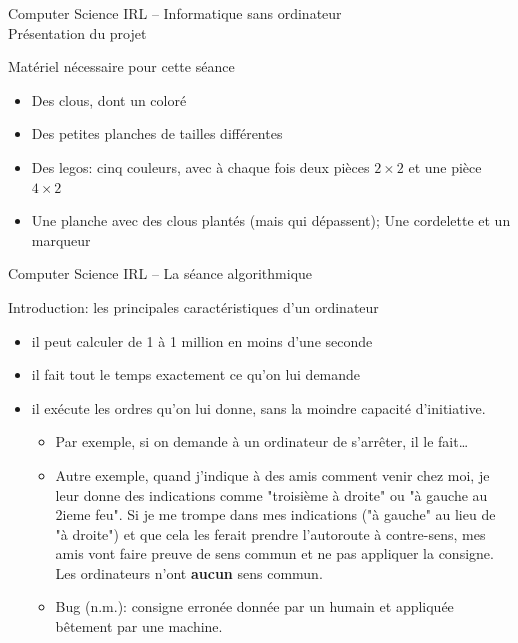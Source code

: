\documentclass[final,hyperref={pdfpagelabels=false}]{beamer}
\renewenvironment{Coupe}{   }{   }
\renewcommand*{\large}{\fontsize{\resultlargeX}{\resultlargeY}\selectfont}
\begin{document}
\begin{Coupe}
\begin{frame}{Computer Science IRL -- Informatique sans ordinateur\\[-5pt]
  {\large Présentation du projet}}
  \begin{block}{Matériel nécessaire pour cette séance}
    \begin{itemize}
    \item Des clous, dont un coloré
    \item Des petites planches de tailles différentes
    \item Des legos: cinq couleurs, avec à chaque fois deux pièces $2\times2$ et une
      pièce $4\times2$
    \item Une planche avec des clous plantés (mais qui dépassent); Une cordelette et un marqueur
    \end{itemize}
  \end{block}
\end{frame}
\begin{frame}{Computer Science IRL -- La séance algorithmique}
  \begin{block}{Introduction: les principales caractéristiques d'un ordinateur}
    \begin{itemize}\vspace{-.2\baselineskip}
    \item {} il peut calculer de 1 à 1
      million en moins d'une seconde
    \item {} il fait
    tout le temps exactement ce qu'on lui demande
    \item {} il exécute les
      ordres qu'on lui donne, sans la moindre capacité d'initiative.
      \begin{itemize}\vspace{-.8\baselineskip}
      \item Par exemple, si on demande à un ordinateur de s'arrêter, il le fait\ldots
      \item Autre exemple, quand j'indique à des amis comment venir chez moi,
        je leur donne des indications comme "troisième à droite" ou "à gauche
        au 2ieme feu". Si je me trompe dans mes indications ("à gauche" au lieu
        de "à droite") et que cela les ferait prendre l'autoroute à
        contre-sens, mes amis vont faire preuve de sens commun et ne pas
        appliquer la consigne. Les ordinateurs n'ont \textbf{aucun} sens commun.
      \item Bug (n.m.): consigne erronée donnée par un humain et appliquée bêtement par une machine.


\end{itemize}
\end{itemize}
\end{block}
\end{frame}
\end{Coupe}
\end{document}
